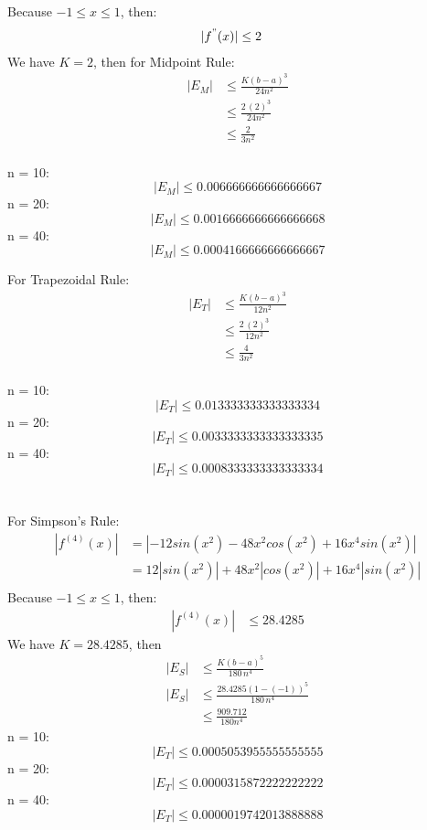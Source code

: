 \documentclass{article}
\begin{document}
    Because $-1 \leq x \leq 1$, then:
    \begin{align*}
        |f^{"}(x)| & \leq 2
    \end{align*}
    We have $K = 2$, then for Midpoint Rule:
    \begin{align*}
        |E_{M}| &\leq \frac{K(b-a)^{3}}{24n^2} \\
        &\leq \frac{2\,(2)^3}{24n^2} \\
        &\leq \frac{2}{3n^2}
    \end{align*} \\

    n = 10: \\
    $$ |E_{M}| \leq 0.006666666666666667 $$
    n = 20: \\
    $$ |E_{M}| \leq 0.0016666666666666668 $$
    n = 40: \\
    $$ |E_{M}| \leq 0.0004166666666666667 $$

    For Trapezoidal Rule:
    \begin{align*}
        |E_{T}| &\leq \frac{K(b-a)^{3}}{12n^2} \\
        &\leq \frac{2\,(2)^3}{12n^2} \\
        &\leq \frac{4}{3n^2}
    \end{align*} \\

    n = 10: \\
    $$ |E_{T}| \leq 0.013333333333333334 $$
    n = 20: \\
    $$ |E_{T}| \leq 0.0033333333333333335 $$
    n = 40: \\
    $$ |E_{T}| \leq 0.0008333333333333334 $$ \\\\

    For Simpson's Rule:\\
    \begin{align*}
        |f^{(4)}(x)| &= |-12sin(x^2) - 48x^2cos(x^2) + 16x^4sin(x^2)| \\
        &= 12|sin(x^2)| + 48 x^2 |cos(x^2)| + 16 x^4 |sin(x^2)| \\
    \end{align*}
    Because $-1 \leq x \leq 1$, then:
    \begin{align*}
        |f^{(4)}(x)| & \leq 28.4285
    \end{align*}
    We have $ K = 28.4285$, then
    \begin{align*}
        |E_{S}| & \leq \frac{K(b-a)^5}{180\,n^4} \\
        |E_{S}| & \leq \frac{28.4285(1-(-1))^5}{180\,n^4} \\
        &\leq \frac{909.712}{180n^4}
    \end{align*}
    n = 10: \\
    $$ |E_{T}| \leq 0.0005053955555555555 $$
    n = 20: \\
    $$ |E_{T}| \leq 0.0000315872222222222 $$
    n = 40: \\
    $$ |E_{T}| \leq 0.0000019742013888888 $$ \\\\
\end{document}
